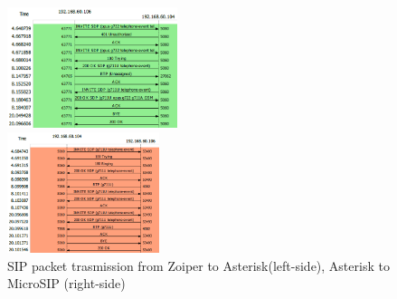 \begin{figure}[htbp]
	\begin{minipage}{0.24\textwidth}
		\begin{flushleft}
			\includegraphics[height=100pt,width=\textwidth]{Images/experiment/a1.png}
		\end{flushleft}
	\end{minipage}
	\begin{minipage}{0.24\textwidth}
		\begin{flushright}
			\includegraphics[height=100pt,width=\textwidth]{Images/experiment/a2.png}
		\end{flushright}
	\end{minipage}
	\caption{SIP packet trasmission from Zoiper to Asterisk(left-side), Asterisk to MicroSIP (right-side)}
	\label{fig:packet-trace}
\end{figure}


